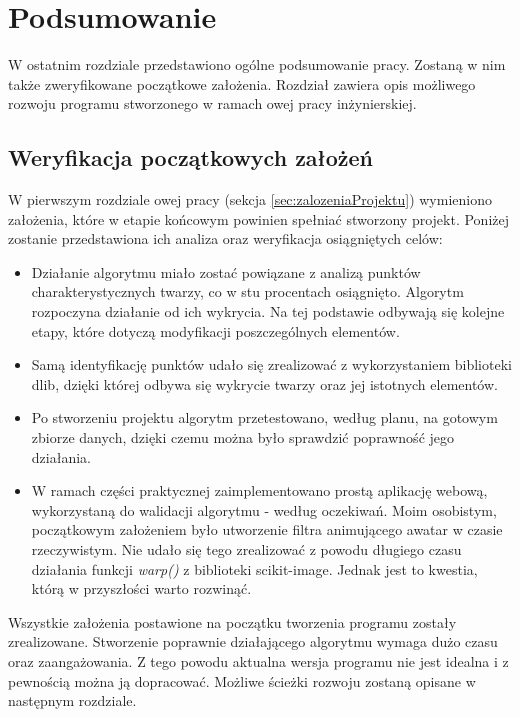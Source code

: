 \chapter{Podsumowanie}
\label{cha:podsumowanie}
W ostatnim rozdziale przedstawiono ogólne podsumowanie pracy. Zostaną w nim także zweryfikowane początkowe założenia. Rozdział zawiera opis możliwego rozwoju programu stworzonego w ramach owej pracy inżynierskiej.

\section{Weryfikacja początkowych założeń}
W pierwszym rozdziale owej pracy (sekcja \ref{sec:zalozeniaProjektu}) wymieniono założenia, które w etapie końcowym powinien spełniać stworzony projekt. Poniżej zostanie przedstawiona ich analiza oraz weryfikacja osiągniętych celów:

\begin{itemize}
    \item Działanie algorytmu miało zostać powiązane z analizą punktów charakterystycznych twarzy, co w stu procentach osiągnięto. Algorytm rozpoczyna działanie od ich wykrycia. Na tej podstawie odbywają się kolejne etapy, które dotyczą modyfikacji poszczególnych elementów.
    \item Samą identyfikację punktów udało się zrealizować z wykorzystaniem biblioteki dlib, dzięki której odbywa się wykrycie twarzy oraz jej istotnych elementów. 
    \item Po stworzeniu projektu algorytm przetestowano, według planu, na gotowym zbiorze danych, dzięki czemu można było sprawdzić poprawność jego działania.
    \item W ramach części praktycznej zaimplementowano prostą aplikację webową, wykorzystaną do walidacji algorytmu - według oczekiwań. Moim osobistym, początkowym założeniem było utworzenie filtra animującego awatar w czasie rzeczywistym. Nie udało się tego zrealizować z powodu długiego czasu działania funkcji \textit{warp()} z biblioteki scikit-image. Jednak jest to kwestia, którą w przyszłości warto rozwinąć. 
\end{itemize}

Wszystkie założenia postawione na początku tworzenia programu zostały zrealizowane. Stworzenie poprawnie działającego algorytmu wymaga dużo czasu oraz zaangażowania. Z tego powodu aktualna wersja programu nie jest idealna i z pewnością można ją dopracować. Możliwe ścieżki rozwoju zostaną opisane w następnym rozdziale.

